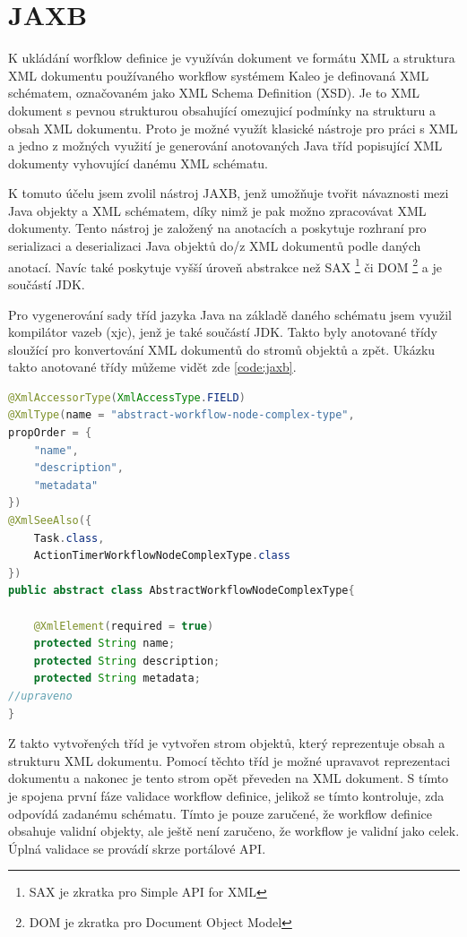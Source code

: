 \documentclass{fithesis}
\begin{document}
\section{JAXB}
K ukládání worfklow definice je využíván dokument ve formátu XML a struktura XML dokumentu používaného workflow systémem Kaleo je definovaná XML schématem, označovaném jako XML Schema Definition (XSD). Je to XML dokument s pevnou strukturou obsahující omezujicí podmínky na strukturu a obsah XML dokumentu. Proto je možné využít klasické nástroje pro práci s XML a jedno z možných využití je generování anotovaných Java tříd popisující XML dokumenty vyhovující danému XML schématu. 

K tomuto účelu jsem zvolil nástroj JAXB, jenž umožňuje tvořit návaznosti mezi Java objekty a XML schématem, díky nimž je pak možno zpracovávat XML dokumenty. Tento nástroj je založený na anotacích a poskytuje rozhraní pro serializaci a deserializaci Java objektů do/z XML dokumentů podle daných anotací. Navíc také poskytuje vyšší úroveň abstrakce než SAX \footnote{SAX je zkratka pro Simple API for XML} či DOM \footnote{DOM je zkratka pro Document Object Model} a je součástí JDK.

Pro vygenerování sady tříd jazyka Java na základě daného schématu jsem využil kompilátor vazeb (xjc), jenž je také součástí JDK. Takto byly anotované třídy sloužící pro konvertování XML dokumentů do stromů objektů a zpět. Ukázku takto anotované třídy můžeme vidět zde \ref{code:jaxb}.

\begin{lstlisting}[language=Java, float =h , caption = Java třída s JAXB anotacemi , label = code:jaxb ]
@XmlAccessorType(XmlAccessType.FIELD)
@XmlType(name = "abstract-workflow-node-complex-type", 
propOrder = {
    "name",
    "description",
    "metadata"
})
@XmlSeeAlso({
    Task.class,
    ActionTimerWorkflowNodeComplexType.class
})
public abstract class AbstractWorkflowNodeComplexType{

    @XmlElement(required = true)
    protected String name;
    protected String description;
    protected String metadata;
//upraveno
}

\end{lstlisting}

Z takto vytvořených tříd je vytvořen strom objektů, který reprezentuje obsah a strukturu XML dokumentu. Pomocí těchto tříd je možné upravavot reprezentaci dokumentu a nakonec je tento strom opět převeden na XML dokument. S tímto je spojena první fáze validace workflow definice, jelikož se tímto kontroluje, zda odpovídá zadanému schématu. Tímto je pouze zaručené, že workflow definice obsahuje validní objekty, ale ještě není zaručeno, že workflow je validní jako celek. Úplná validace se provádí skrze portálové API.
\end{document}
